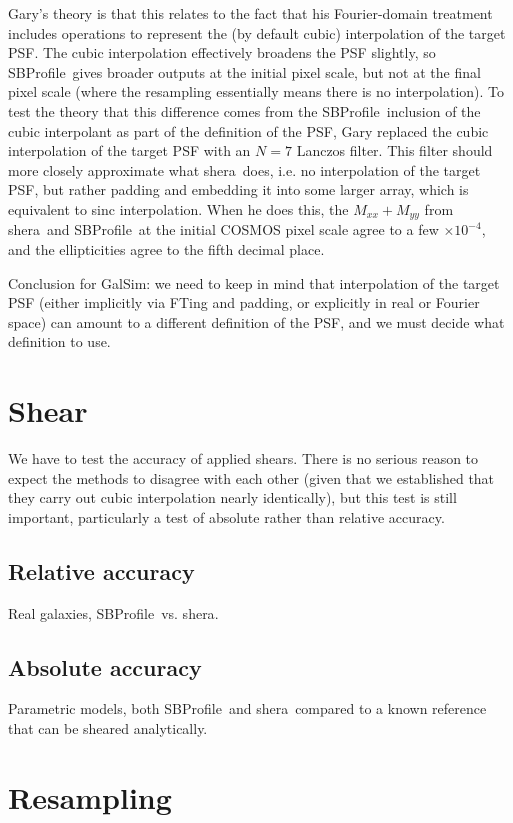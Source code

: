 \documentclass[preprint]{aastex}
\newcommand{\shera}{{\sc shera}}
\newcommand{\sbp}{SBProfile}
\newcommand{\mxx}{\ensuremath{M_{xx}}}
\newcommand{\myy}{\ensuremath{M_{yy}}}
\begin{document}
Gary's theory is that
this relates to the fact that his Fourier-domain treatment includes
operations to represent the (by default cubic) interpolation of the
target PSF.  The cubic interpolation effectively broadens the PSF
slightly, so \sbp\ gives broader outputs at the initial pixel scale,
but not at the final pixel scale (where the resampling essentially
means there is no interpolation).  To test the theory that
this difference comes from the \sbp\ inclusion of the cubic
interpolant as part of the definition of the PSF, Gary replaced the
cubic interpolation of the target PSF with an $N=7$ Lanczos filter.
This filter should more closely approximate what \shera\ does, i.e. no
interpolation of the target PSF, but rather padding and embedding it
into some larger array, which is equivalent to sinc interpolation.
When he does this, the $\mxx+\myy$ from \shera\ and \sbp\ at the
initial COSMOS pixel scale agree to a few $\times 10^{-4}$, and the
ellipticities agree to the fifth decimal place.  

Conclusion for GalSim: we need to keep in mind that interpolation of
the target PSF (either implicitly via FTing and padding, or explicitly
in real or Fourier space) can amount to a different definition of the
PSF, and we must decide what definition to use.

\section{Shear}

We have to test the accuracy of applied shears.  There is no serious
reason to expect the methods to disagree with each other (given that
we established that they carry out cubic interpolation nearly
identically), but this test is still important, particularly a test of
absolute rather than relative accuracy.

\subsection{Relative accuracy}

Real galaxies, \sbp\ vs. \shera.

\subsection{Absolute accuracy}

Parametric models, both \sbp\ and \shera\ compared to a known
reference that can be sheared analytically.

\section{Resampling}
\end{document}
